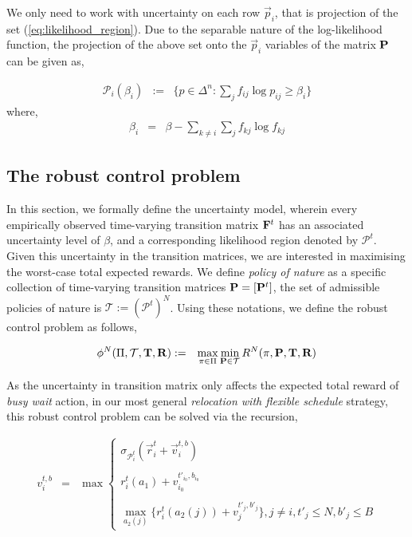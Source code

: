 We only need to work with uncertainty on each row $\vec{p}_i$, that is projection of the set (\ref{eq:likelihood_region}). Due to the separable nature of the log-likelihood function, the projection of the above set onto the $\vec{p}_i$ variables of the matrix $\mathbf{P}$ can be given as,

\begin{eqnarray}
\mathcal{P}_i(\beta_i) &:=& \bigg\{p \in \Delta^n : \sum_{j}f_{ij}\log{p_{ij}} \geq \beta_i \bigg\}
\end{eqnarray}
where,
\begin{eqnarray}
\beta_i &=& \beta - \sum_{k \neq i}\sum_{j}f_{kj}\log{f_{kj}}
\end{eqnarray}

\subsection{The robust control problem}

In this section, we formally define the uncertainty model, wherein every empirically observed time-varying transition matrix $\mathbf{F}^t$ has an associated uncertainty level of $\beta$, and a corresponding likelihood region denoted by $\mathcal{P}^t$. Given this uncertainty in the transition matrices, we are interested in maximising the worst-case total expected rewards. We define \textit{policy of nature} as a specific collection of time-varying transition matrices $\mathbf{P} = [\mathbf{P}^t]$, the set of admissible policies of nature is $\mathcal{T} := (\mathcal{P}^t)^N$. Using these notations, we define the robust control problem as follows,

\begin{eqnarray}
\phi^N(\Pi, \mathcal{T}, \mathbf{T}, \mathbf{R}) &:=& \max_{\pi \in \Pi} \min_{\mathbf{P} \in \mathcal{T}} R^N(\pi, \mathbf{P}, \mathbf{T}, \mathbf{R})
\end{eqnarray}

As the uncertainty in transition matrix only affects the expected total reward of \textit{busy wait} action, in our most general \textit{relocation with flexible schedule} strategy, this robust control problem can be solved via the recursion,

\begin{eqnarray}
v_{i}^{t,b} &=& \max
    \begin{cases}
    \sigma_{\mathcal{P}_{i}^{t}}(\vec{r}_{i}^{t} + \vec{v}_{i}^{t,b})\\ \\
    r_{i}^{t}(a_1) + v_{i_0}^{t'_{i_0},b_{i_0}} \\ \\
    \max_{a_2(j)} \bigg\{r_{i}^{t}(a_2(j)) + v_{j}^{t'_{j},b'_{j}}\bigg\}, j \neq i, t'_{j} \leq N, b'_{j} \leq B
    \end{cases}
\label{eq:robust_dynamic_program}
\end{eqnarray}

